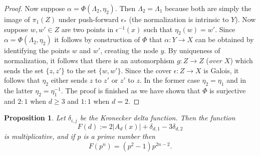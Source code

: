 \documentclass[reqno, 11pt]{amsart}
\newtheorem{proposition}[theorem]{Proposition}
\begin{document}
\begin{proof}
    Now suppose $\alpha = \Phi(\Lambda_{2}, \eta_{2})$. Then $\Lambda_{2} = \Lambda_{1}$ because both are simply the image of $\pi_{1}(Z)$ under push-forward $\epsilon_{*}$ (the normalization is intrinsic to $Y$).  Now suppose $w,w' \in Z$ are two points in $\epsilon^{-1}(x)$ such that $\eta_{2}(w)=w'$. Since $\alpha = \Phi(\Lambda_{2},\eta_{2})$ it follows by construction of $\Phi$ that $\alpha:Y \to X$ can be obtained by identifying the points $w$ and $w'$, creating the node $y$. By uniqueness of normalization, it follows that there is an automorphism  $g: Z \to Z$ (\emph{over $X$}) which sends the set $\{z,z'\}$ to the set $\{w,w'\}$.  Since the cover $\epsilon: Z \to X$ is Galois, it follows that $\eta_{2}$ either sends $z$ to $z'$ or $z'$ to $z$.  In the former case $\eta_{2}=\eta_{1}$ and in the latter $\eta_{2} = \eta_{1}^{-1}$.  The proof is finished as we have shown that $\Phi$ is surjective and $2:1$ when $d \geq 3$ and $1:1$ when $d=2$.
\end{proof}


\begin{proposition}
    \label{proposition:Deltazeromultiplicative} Let $\delta_{i,j}$ be the Kronecker delta function. Then the function \[F(d) := 2|A_{d}(x)| + \delta_{d,1}-3\delta_{d,2}\] is multiplicative, and if $p$ is a prime number then \[F(p^{n}) = (p^{2}-1)p^{2n-2}.\]
\end{proposition}
\end{document}
